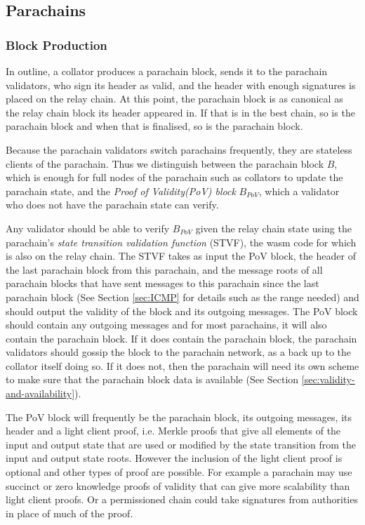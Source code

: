 \subsection{Parachains}\label{sec:parachains}

\subsubsection{Block Production}\label{sec:parachainblockproduction}
In outline, a collator produces a parachain block, sends it to the parachain validators,
who sign its header as valid, and the header with enough signatures is placed on the relay chain.
At this point, the parachain block is as canonical as the relay chain block its header appeared in.
If that is in the best chain, so is the parachain block and when that is finalised, so is the parachain block.

Because the parachain validators switch parachains frequently, they are stateless clients of the parachain.
Thus we distinguish between the parachain block $B$, which is enough for full nodes of the parachain such as collators to update the parachain state,
and the {\em Proof of Validity(PoV) block} $B_{PoV}$, which a validator who does not have the parachain state can verify.

Any validator should be able to verify $B_{PoV}$ given the relay chain state using the parachain's {\em state transition validation function} (STVF),
the wasm code for which is also on the relay chain.
The STVF takes as input the PoV block, the header of the last parachain block from this parachain,
and the message roots of all parachain blocks that have sent messages to this parachain since the last parachain block
(See Section \ref{sec:ICMP} for details such as the range needed) and should output the validity of the block and its outgoing messages.
The PoV block should contain any outgoing messages and for most parachains, it will also contain the parachain block.
If it does contain the parachain block, the parachain validators should gossip the block to the parachain network, as a back up to the collator itself doing so.
If it does not, then the parachain will need its own scheme to make sure that the parachain block data is available (See Section \ref{sec:validity-and-availability}).

The PoV block will frequently be the parachain block, its outgoing messages, its header and a light client proof,
i.e. Merkle proofs that give all elements of the input and output state that are used or modified by the state transition from the input and output state roots.
However the inclusion of the light client proof is optional and other types of proof are possible.
For example a parachain may use succinct or zero knowledge proofs of validity that can give more scalability than light client proofs.
Or a permissioned chain could take signatures from authorities in place of much of the proof.

